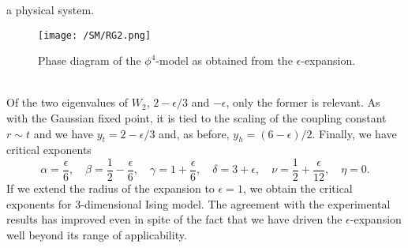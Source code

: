 a physical system.
\begin{figure}[!h]
\centering
\texttt{[image: /SM/RG2.png]}
\caption{Phase diagram of the $\phi^4$-model as obtained from the $\epsilon$-expansion.}
\end{figure}
\\
Of the two eigenvalues of $W_2$, $2 - {\epsilon}/{3}$ and $-\epsilon$, only the former is relevant. As with the Gaussian fixed point, it is tied to the scaling of the coupling constant $r \sim t$ and we have $y_t = 2 - {\epsilon}/{3}$ and, as before, $y_h = (6-\epsilon)/{2}$. Finally, we have critical exponents
\[\alpha = \frac{\epsilon}{6} , \quad \beta = \frac{1}{2} - \frac{\epsilon}{6} , \quad \gamma = 1 + \frac{\epsilon}{6} , \quad \delta = 3 + \epsilon , \quad \nu = \frac{1}{2} + \frac{\epsilon}{12} , \quad \eta = 0.\]
If we extend the radius of the expansion to $\epsilon = 1$,
we obtain the critical exponents for 3-dimensional Ising model. The agreement with the experimental results has improved even in spite of the fact that we have driven the $\epsilon$-expansion well beyond its range of applicability.
